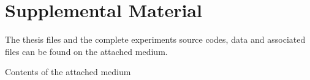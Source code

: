 \chapter{Supplemental Material}
\label{ch:supplemental_material}

The thesis files and the complete experiments source codes, data and associated files can be found on the attached medium.

%
%

\vfill

\begin{dirfigure}%
\caption{Contents of the attached medium}
\end{dirfigure}
